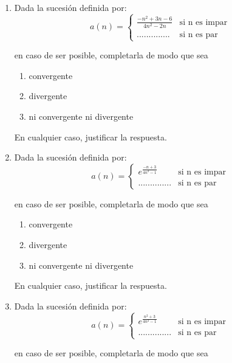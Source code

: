 \documentclass[12pt]{article}
\theoremstyle{definition}
\begin{document}
\begin{enumerate}

\item  
Dada la sucesión definida por:
\begin{equation*}
a(n) =
\begin{cases} 
  \frac{-n^2+3n-6}{4n^2-2n}  & \text{si  n es impar} \\
..............& \text{si  n es par}
\end{cases}
\end{equation*}

en caso de ser posible, completarla de modo que sea

 \begin{enumerate}
        \item convergente
        \item divergente
        \item ni convergente ni divergente
\end{enumerate}
En cualquier caso, justificar la respuesta.

\item  
Dada la sucesión definida por:
\begin{equation*}
	a(n) =
	\begin{cases} 
		e^{\frac{-n+3}{4n^2-1}}  & \text{si  n es impar} \\
		..............& \text{si  n es par}
	\end{cases}
\end{equation*}

en caso de ser posible, completarla de modo que sea

\begin{enumerate}
	\item convergente
	\item divergente
	\item ni convergente ni divergente
\end{enumerate}
En cualquier caso, justificar la respuesta.

\item  
Dada la sucesión definida por:
\begin{equation*}
	a(n) =
	\begin{cases} 
		e^{\frac{n^2+3}{4n^2-1}}  & \text{si  n es impar} \\
		..............& \text{si  n es par}
	\end{cases}
\end{equation*}

en caso de ser posible, completarla de modo que sea


\end{enumerate}
\end{document}
